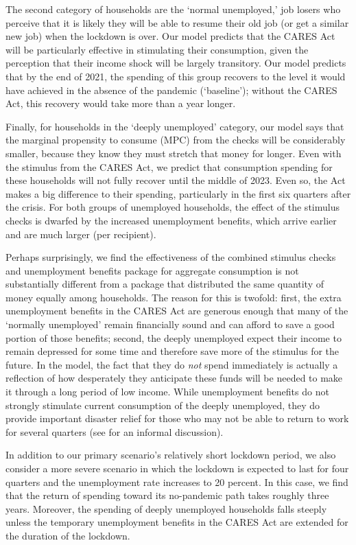 \documentclass[titlepage,a4paper]{\econtex}
\begin{document}
The second category of households are the `normal unemployed,' job losers who perceive that it is likely they will be able to resume their old job (or get a similar new job) when the lockdown is over.
Our model predicts that the CARES Act will be particularly effective in stimulating their consumption, given the perception that their income shock will be largely transitory.  Our model predicts that by the end of 2021, the spending of this group recovers to the level it would have achieved in the absence of the pandemic (`baseline'); without the CARES Act, this recovery would take more than a year longer.

Finally, for households in the `deeply unemployed' category, our model says that the marginal propensity to consume (MPC) from the checks will be considerably smaller, because they know they must stretch that money for longer.
Even with the stimulus from the CARES Act, we predict that consumption spending for these households will not fully recover until the middle of 2023.
Even so, the Act makes a big difference to their spending, particularly in the first six quarters after the crisis.
For both groups of unemployed households, the effect of the stimulus checks is dwarfed by the increased unemployment benefits, which arrive earlier and are much larger (per recipient).

Perhaps surprisingly, we find the effectiveness of the combined stimulus checks and unemployment benefits package for aggregate consumption is not substantially different from a package that distributed the same quantity of money equally among households.
The reason for this is twofold: first, the extra unemployment benefits in the CARES Act are generous enough that many of the `normally unemployed' remain financially sound and can afford to save a good portion of those benefits; second, the deeply unemployed expect their income to remain depressed for some time and therefore save more of the stimulus for the future.  In the model, the fact that they do \textit{not} spend immediately is actually a reflection of how desperately they anticipate these funds will be needed to make it through a long period of low income.
While unemployment benefits do not strongly stimulate current consumption of the deeply unemployed, they do provide important disaster relief for those who may not be able to return to work for several quarters (see \cite{krugman_corona} for an informal discussion).

In addition to our primary scenario's relatively short lockdown period, we also consider a more severe scenario in which the lockdown is expected to last for four quarters and the unemployment rate increases to 20 percent.
In this case, we find that the return of spending toward its no-pandemic path takes roughly three years. Moreover, the spending of deeply unemployed households falls steeply unless the temporary unemployment benefits in the CARES Act are extended for the duration of the lockdown.
\end{document}
